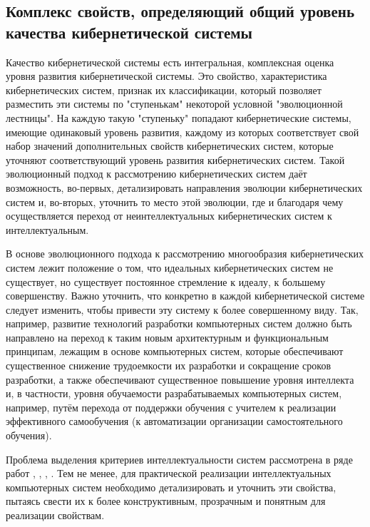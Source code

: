 \subsection{Комплекс свойств, определяющий общий уровень качества кибернетической системы}
{\label{sec_cyb_syst_overall_quality}} 

Качество кибернетической системы есть интегральная, комплексная оценка уровня развития кибернетической системы. 
Это свойство, характеристика кибернетических систем, признак их классификации, который позволяет разместить эти системы по "ступенькам"{} некоторой условной "эволюционной лестницы"{}.
На каждую такую "ступеньку"{} попадают кибернетические системы, имеющие одинаковый уровень развития, каждому из которых соответствует свой набор значений дополнительных свойств кибернетических систем, которые уточняют соответствующий уровень развития кибернетических систем. 
Такой эволюционный подход к рассмотрению кибернетических систем даёт возможность, во-первых, детализировать направления эволюции кибернетических систем и, во-вторых, уточнить то место этой эволюции, где и благодаря чему осуществляется переход от неинтеллектуальных кибернетических систем к интеллектуальным.

В основе эволюционного подхода к рассмотрению многообразия кибернетических систем лежит положение о том, что идеальных кибернетических систем не существует, но существует постоянное стремление к идеалу, к большему совершенству. 
Важно уточнить, что конкретно в каждой кибернетической системе следует изменить, чтобы привести эту систему к более совершенному виду.
Так, например, развитие технологий разработки компьютерных систем должно быть направлено на переход к таким новым архитектурным и функциональным принципам, лежащим в основе компьютерных систем, которые обеспечивают существенное снижение трудоемкости их разработки и сокращение сроков разработки, а также обеспечивают существенное повышение уровня интеллекта и, в частности, уровня обучаемости разрабатываемых компьютерных систем, например, путём перехода от поддержки обучения с учителем к реализации эффективного самообучения (к автоматизации организации самостоятельного обучения). 

Проблема выделения критериев интеллектуальности систем рассмотрена в ряде работ , , , .
Тем не менее, для практической реализации интеллектуальных компьютерных систем необходимо детализировать и уточнить эти свойства, пытаясь свести их к более конструктивным, прозрачным и понятным для реализации свойствам.

